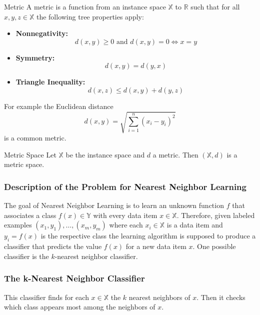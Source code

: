 \documentclass[english]{panikzettel}
\begin{document}
\begin{halfboxl}
\vspace{-\baselineskip}
\begin{defi}{Metric}
A metric is a function from an instance space $\mathbb{X}$ to $\mathbb{R}$ such that for all $x,y,z\in\mathbb{X}$ the following tree properties apply:
\begin{itemize}
\item \textbf{Nonnegativity:}
\vspace{-0.5\baselineskip}
\[
d(x,y)\geq 0 \text{ and } d(x,y)=0 \iff x=y
\]
\item \textbf{Symmetry:}
\vspace{-0.5\baselineskip}
\[
d(x,y)=d(y,x)
\]
\item \textbf{Triangle Inequality:}
\vspace{-0.5\baselineskip}
\[
d(x,z)\leq d(x,y)+d(y,z)
\]
\end{itemize}
\end{defi}
\end{halfboxl}
\begin{halfboxr}
\vspace{-\baselineskip}
For example the Euclidean distance
\[
d(x,y)=\sqrt{\sum_{i=1}^n(x_i-y_i)^2}
\]
is a common metric.\\


\begin{defi}{Metric Space}
Let $\mathbb{X}$ be the instance space and $d$ a metric. Then $(\mathbb{X}, d)$ is a metric space.
\end{defi}
\end{halfboxr}


\subsubsection{Description of the Problem for Nearest Neighbor Learning}
The goal of Nearest Neighbor Learning is to learn an unknown function $f$ that associates a class $f(x)\in\mathbb{Y}$ with every data item $x\in \mathbb{X}$. Therefore, given labeled examples $(x_1,y_1),\ldots,(x_m,y_m)$ where each $x_i\in\mathbb{X}$ is a data item and $y_i=f(x)$ is the respective class the learning algorithm is supposed to produce a classifier that predicts the value $f(x)$ for a new data item $x$. One possible classifier is the $k$-nearest neighbor classifier.

\subsubsection{The k-Nearest Neighbor Classifier}
This classifier finds for each $x\in\mathbb{X}$ the $k$ nearest neighbors of $x$. Then it checks which class appears most among the neighbors of $x$.
\end{document}
